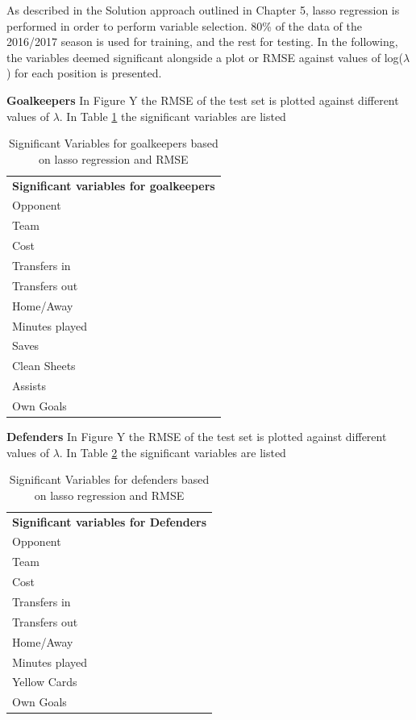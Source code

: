 As described in the Solution approach outlined in Chapter 5, lasso regression is performed in order to perform variable selection. 80\% of the data of the 2016/2017 season is used for training, and the rest for testing. In the following, the variables deemed significant alongside a plot or RMSE against values of log($\lambda$) for each position is presented.\newpar

\textbf{Goalkeepers}
In Figure Y the RMSE of the test set is plotted against different values of $\lambda$. In Table \ref{tab:sig_var_GLK} the significant variables are listed

\begin{table}[H]
\centering
\caption{Significant Variables for goalkeepers based on lasso regression and RMSE}
\label{tab:sig_var_GLK}
\begin{tabular}{l}
\textbf{Significant variables for goalkeepers }\\
Opponent                              \\
Team                                  \\
Cost                                  \\
Transfers in                          \\
Transfers out                         \\
Home/Away                             \\
Minutes played                        \\
Saves                                 \\
Clean Sheets                          \\
Assists                               \\
Own Goals                            
\end{tabular}
\end{table}

\textbf{Defenders}
In Figure Y the RMSE of the test set is plotted against different values of $\lambda$. In Table \ref{tab:sig_var_DEF} the significant variables are listed

\begin{table}[H]
\centering
\caption{Significant Variables for defenders based on lasso regression and RMSE}
\label{tab:sig_var_DEF}
\begin{tabular}{l}
\textbf{Significant variables for Defenders }\\
Opponent                              \\
Team                                  \\
Cost                                  \\
Transfers in                          \\
Transfers out                         \\
Home/Away                             \\
Minutes played                        \\
Yellow Cards                          \\
Own Goals                                               
\end{tabular}
\end{table}

